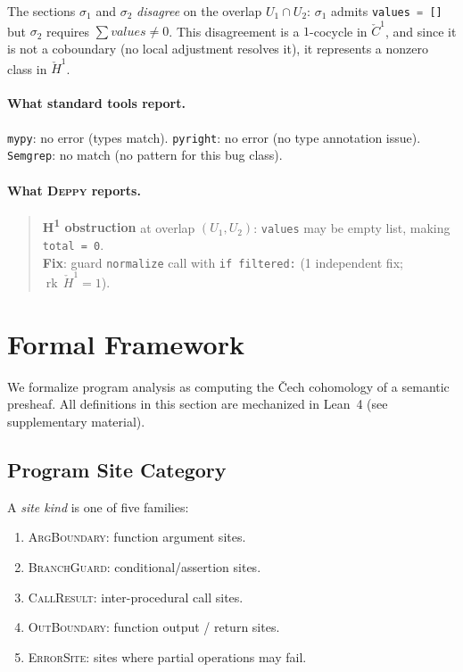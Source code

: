 \documentclass[acmsmall,screen,review,anonymous]{acmart}
\theoremstyle{remark}
\newcommand{\CC}{\check{C}}
\newcommand{\Hc}[1]{\check{H}^{#1}}
\newcommand{\rk}{\operatorname{rk}}
\newcommand{\py}[1]{\lstinline[language=Python]{#1}}
\begin{document}
The sections $\sigma_1$ and $\sigma_2$ \emph{disagree} on the overlap
$U_1 \cap U_2$: $\sigma_1$ admits \py{values = []} but $\sigma_2$
requires $\sum \mathit{values} \neq 0$.  This disagreement is a
$1$-cocycle in $\CC^1$, and since it is not a coboundary (no local
adjustment resolves it), it represents a nonzero class in $\Hc{1}$.

\paragraph{What standard tools report.}
\texttt{mypy}: no error (types match).
\texttt{pyright}: no error (no type annotation issue).
\texttt{Semgrep}: no match (no pattern for this bug class).

\paragraph{What \textsc{Deppy} reports.}
\begin{quote}\small
\textbf{H\textsuperscript{1} obstruction} at overlap $(U_1, U_2)$:
\texttt{values} may be empty list, making \texttt{total = 0}.\\
\textbf{Fix}: guard \texttt{normalize} call with \texttt{if filtered:}
(1 independent fix; $\rk\,\Hc{1} = 1$).
\end{quote}

\section{Formal Framework}\label{sec:framework}

We formalize program analysis as computing the \v{C}ech cohomology of a
semantic presheaf.  All definitions in this section are mechanized in
Lean~4 (see supplementary material).

\subsection{Program Site Category}\label{sec:site-category}

\begin{definition}\label{def:site-kind}
A \emph{site kind} is one of five families:
\begin{enumerate}[nosep]
  \item \textsc{ArgBoundary}: function argument sites.
  \item \textsc{BranchGuard}: conditional/assertion sites.
  \item \textsc{CallResult}: inter-procedural call sites.
  \item \textsc{OutBoundary}: function output / return sites.
  \item \textsc{ErrorSite}: sites where partial operations may fail.
\end{enumerate}
\end{definition}
\end{document}
